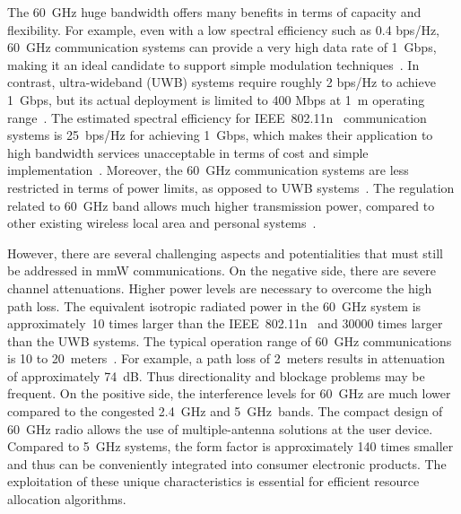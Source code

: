 \documentclass[journal, 10pt, twocolumn]{IEEEtran}
\begin{document}
The 60~GHz huge bandwidth offers many benefits in terms of capacity and flexibility.
For example, even with a low spectral efficiency such as 0.4 bps/Hz, 60~GHz communication systems can provide a very high data rate of 1~Gbps, making it an ideal candidate to support simple modulation techniques~\cite{Daniels10}. In contrast, ultra-wideband (UWB) systems require roughly 2 bps/Hz to achieve 1~Gbps, but its actual deployment is limited to 400 Mbps at 1~m operating range~\cite{Geng09}. The estimated spectral efficiency for IEEE~802.11n~\cite{802_11n} communication systems is 25~bps/Hz for achieving 1~Gbps, which makes their application to high bandwidth services unacceptable in terms of cost and simple implementation~\cite{Daniels10}.
Moreover, the 60~GHz communication systems are less restricted in terms of power limits, as opposed to UWB systems~\cite{Yang04}. The regulation related to 60~GHz band allows much higher transmission power, compared to other existing wireless local area and personal systems~\cite{Doan04}.

However, there are several challenging aspects and potentialities that must still be addressed in mmW communications. On the negative side, there are severe channel attenuations. Higher power levels are necessary to overcome the high path loss. The equivalent isotropic radiated power in the 60~GHz system is approximately~10 times larger than the IEEE~802.11n~\cite{802_11n} and 30000 times larger than the UWB systems. The typical operation range of 60~GHz communications is 10 to 20~meters~\cite{802_15_3c}. For example, a path loss of 2~meters results in attenuation of approximately 74~dB. Thus directionality and blockage problems may be frequent. On the positive side, the interference levels for 60~GHz are much lower compared to the congested 2.4~GHz and 5~GHz~bands.
The compact design of 60~GHz radio allows the use of multiple-antenna solutions at the user device. Compared to 5~GHz systems, the form factor is approximately 140 times smaller and thus can be conveniently integrated into consumer electronic products. The exploitation of these unique characteristics is essential for efficient resource allocation algorithms.
\end{document}
